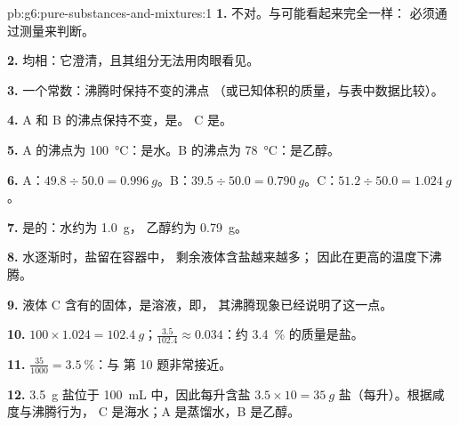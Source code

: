 \begin{solution}{pb:g6:pure-substances-and-mixtures:1}
\textbf{1.} 不对。与可能看起来完全一样：
必须通过测量来判断。

\textbf{2.} 均相：它澄清，且其组分无法用肉眼看见。

\textbf{3.} 一个常数：沸腾时保持不变的沸点
（或已知体积的质量，与表中数据比较）。

\textbf{4.} A 和 B 的沸点保持不变，是。
C 是。

\textbf{5.} A 的沸点为 \qty{100}{\celsius}：是水。B 的沸点为
\qty{78}{\celsius}：是乙醇。

\textbf{6.} A：$49.8 \div 50.0 = \qty{0.996}{g}$。B：$39.5 \div 50.0 =
\qty{0.790}{g}$。C：$51.2 \div 50.0 = \qty{1.024}{g}$。

\textbf{7.} 是的：水约为 \qty{1.0}{g}，
乙醇约为 \qty{0.79}{g}。

\textbf{8.} 水逐渐时，盐留在容器中，
剩余液体含盐越来越多；
因此在更高的温度下沸腾。

\textbf{9.} 液体 C 含有的固体，是溶液，即，
其沸腾现象已经说明了这一点。

\textbf{10.} $100 \times 1.024 = \qty{102.4}{g}$；$\frac{3.5}{102.4}
\approx 0.034$：约 \qty{3.4}{\percent} 的质量是盐。

\textbf{11.} $\frac{35}{1000} = \qty{3.5}{\percent}$：与
第 10 题非常接近。

\textbf{12.} \qty{3.5}{g} 盐位于 \qty{100}{mL} 中，因此每升含盐 $3.5 \times 10 =
\qty{35}{g}$ 盐（每升）。根据咸度与沸腾行为，
C 是海水；A 是蒸馏水，B 是乙醇。
\end{solution}

